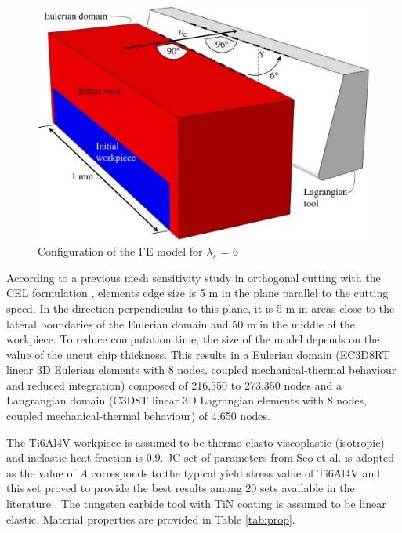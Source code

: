 \documentclass[preprint,12pt,times]{elsarticle}
\begin{document}
\begin{figure}[!h]
\centering
\includegraphics[width = 140 mm]{Figures/FEConfig}
\caption{Configuration of the FE model for $\lambda_s$ = 6\textdegree{}}
\label{FEConfig}
\end{figure}

According to a previous mesh sensitivity study in orthogonal cutting with the CEL formulation \cite{ducobu_Finite_2017}, elements edge size is 5 \textmu{}m in the plane parallel to the cutting speed. In the direction perpendicular to this plane, it is 5 \textmu{}m in areas close to the lateral boundaries of the Eulerian domain and 50 \textmu{}m in the middle of the workpiece. To reduce computation time, the size of the model depends on the value of the uncut chip thickness. This results in a Eulerian domain (EC3D8RT linear 3D Eulerian elements with 8 nodes, coupled mechanical-thermal behaviour and reduced integration) composed of 216,550 to 273,350 nodes and a Langrangian domain (C3D8T linear 3D Lagrangian elements with 8 nodes, coupled mechanical-thermal behaviour) of 4,650 nodes.

The Ti6Al4V workpiece is assumed to be thermo-elasto-viscoplastic (isotropic) and inelastic heat fraction is 0.9. JC set of parameters from Seo et al. \cite{seo_Constitutive_2005} is adopted as the value of $A$ corresponds to the typical yield stress value of Ti6Al4V and this set proved to provide the best results among 20 sets available in the literature \cite{ducobu_Importance_2017}.  The tungsten carbide tool with TiN coating is assumed to be linear elastic. Material properties are provided in Table \ref{tab:prop}.
\end{document}
